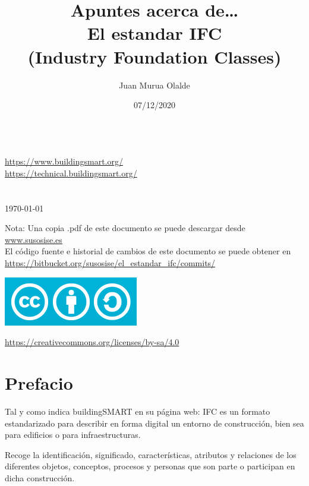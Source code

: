 \documentclass[spanish,12pt,a4paper,final,oneside]{book}
\title{Apuntes acerca de\ldots \\El estandar IFC \\(Industry Foundation Classes)}
\author{Juan Murua Olalde}
\date{07/12/2020}
\begin{document}
\begin{titlepage}

\begin{flushright}
\vspace{2cm}
\begin{Huge}\MyTitle\end{Huge}
\\
\vspace{0.2cm}
\url{https://www.buildingsmart.org/}
\\ \url{https://technical.buildingsmart.org/}
\\
\vspace{1cm}
\MyAuthor
\\
\vspace{1cm}
\MyDate
\\ \today
\\\end{flushright}


\vfill
Nota: Una copia .pdf de este documento se puede descargar desde \\ \url{www.susosise.es}
\\El código fuente e historial de cambios de este documento se puede obtener en \\ \url{https://bitbucket.org/susosise/el_estandar_ifc/commits/}
\begin{flushleft}
\includegraphics[scale=0.3]{CreativeCommons-Attribution-ShareAlike-logo}
\begin{small}\url{https://creativecommons.org/licenses/by-sa/4.0}\end{small}
\end{flushleft}

\end{titlepage}

\hypersetup{linkcolor=black}
\tableofcontents


\chapter{Prefacio}
Tal y como indica buildingSMART en su página web: IFC es un formato estandarizado para describir en forma digital un entorno de construcción, bien sea para edificios o para infraestructuras.

Recoge la identificación, significado, características, atributos y relaciones de los diferentes objetos, conceptos, procesos y personas que son parte o participan en dicha construcción.
\end{document}
